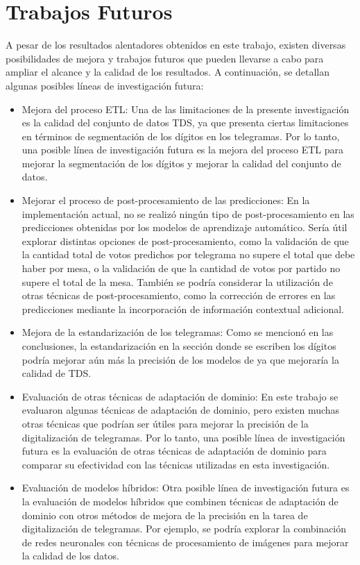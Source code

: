 \section{Trabajos Futuros}

A pesar de los resultados alentadores obtenidos en este trabajo, existen diversas posibilidades de mejora y trabajos
futuros que pueden llevarse a cabo para ampliar el alcance y la calidad de los resultados. A continuación, se detallan
algunas posibles líneas de investigación futura:

\begin{itemize}
    \item Mejora del proceso ETL: Una de las limitaciones de la presente investigación es la calidad del conjunto de datos TDS,
          ya que presenta ciertas limitaciones en términos de segmentación de los dígitos en los telegramas. Por lo tanto, una
          posible línea de investigación futura es la mejora del proceso ETL para mejorar la segmentación de los dígitos y
          mejorar la calidad del conjunto de datos.
    \item Mejorar el proceso de post-procesamiento de las predicciones: En la implementación actual, no se realizó ningún tipo de
          post-procesamiento en las predicciones obtenidas por los modelos de aprendizaje automático. Sería útil explorar
          distintas opciones de post-procesamiento, como la validación de que la cantidad total de votos predichos por telegrama
          no supere el total que debe haber por mesa, o la validación de que la cantidad de votos por partido no supere el total
          de la mesa. También se podría considerar la utilización de otras técnicas de post-procesamiento, como la corrección de
          errores en las predicciones mediante la incorporación de información contextual adicional.
    \item Mejora de la estandarización de los telegramas: Como se mencionó en las conclusiones, la estandarización en la sección
          donde se escriben los dígitos podría mejorar aún más la precisión de los modelos de ya que mejoraría la calidad de TDS.
    \item Evaluación de otras técnicas de adaptación de dominio: En este trabajo se evaluaron algunas técnicas de adaptación de
          dominio, pero existen muchas otras técnicas que podrían ser útiles para mejorar la precisión de la digitalización de
          telegramas. Por lo tanto, una posible línea de investigación futura es la evaluación de otras técnicas de adaptación de
          dominio para comparar su efectividad con las técnicas utilizadas en esta investigación.
    \item Evaluación de modelos híbridos: Otra posible línea de investigación futura es la evaluación de modelos híbridos que
          combinen técnicas de adaptación de dominio con otros métodos de mejora de la precisión en la tarea de digitalización de
          telegramas. Por ejemplo, se podría explorar la combinación de redes neuronales con técnicas de procesamiento de
          imágenes para mejorar la calidad de los datos.
\end{itemize}

